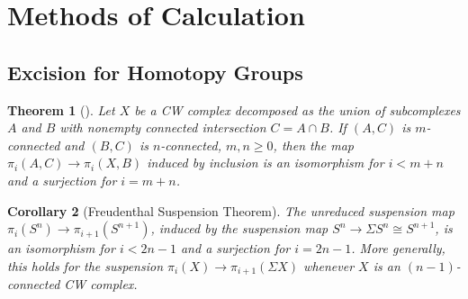 \documentclass[reqno]{amsart}
\newtheorem{theorem}{Theorem}[section]
\newtheorem{corollary}[theorem]{Corollary}
\theoremstyle{definition}
\theoremstyle{remark}
\begin{document}
\section{Methods of Calculation}


\subsection{Excision for Homotopy Groups}

\begin{theorem}[]\label{Thm:Homotopy-Excision}
    Let $X$ be a CW complex decomposed as the union of
    subcomplexes $A$ and $B$ with nonempty connected
    intersection $C = A \cap B$. If
    $(A,C)$ is $m$-connected and
    $\left( B,C \right) $ is $n$-connected,
    $m,n \ge 0$, then the map
    $\pi_i (A,C) \to \pi_i (X,B)$ induced
    by inclusion is an isomorphism for
    $i < m+n$ and a surjection for
    $i = m+n$.
\end{theorem}

\begin{corollary}[Freudenthal Suspension Theorem]
    The unreduced suspension map
    $\pi_i (S^{n}) \to 
    \pi_{i+1} \left( S^{n+1} \right) $, induced
    by the suspension map $S^{n} \to 
    \Sigma S^{n} \cong S^{n+1}$, is an
    isomorphism for
    $i < 2n-1$ and a surjection for
    $i = 2n-1$. More generally, this holds for
    the suspension
    $\pi_i (X) \to \pi_{i+1}\left( \Sigma X \right) $ whenever
    $X$ is an $(n-1)$-connected CW complex.
\end{corollary}
\end{document}
